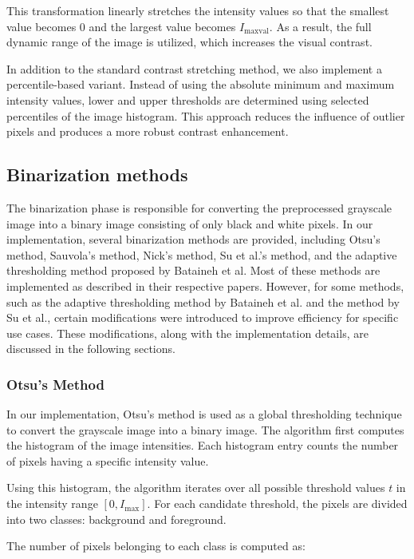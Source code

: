 This transformation linearly stretches the intensity values so that the smallest value becomes $0$ and the largest value becomes $I_{\text{maxval}}$. As a result, the full dynamic range of the image is utilized, which increases the visual contrast.

In addition to the standard contrast stretching method, we also implement a percentile-based variant. Instead of using the absolute minimum and maximum intensity values, lower and upper thresholds are determined using selected percentiles of the image histogram. This approach reduces the influence of outlier pixels and produces a more robust contrast enhancement.

\subsection{Binarization methods}

The binarization phase is responsible for converting the preprocessed grayscale image into a binary image consisting of only black and white pixels. In our implementation, several binarization methods are provided, including Otsu's method, Sauvola's method, Nick's method, Su et al.'s method, and the adaptive thresholding method proposed by Bataineh et al. Most of these methods are implemented as described in their respective papers. However, for some methods, such as the adaptive thresholding method by Bataineh et al. and the method by Su et al., certain modifications were introduced to improve efficiency for specific use cases. These modifications, along with the implementation details, are discussed in the following sections.

\subsubsection{Otsu's Method}
In our implementation, Otsu's method \cite{otsu1979threshold} is used as a global thresholding
technique to convert the grayscale image into a binary image.
The algorithm first computes the histogram of the image intensities.
Each histogram entry counts the number of pixels having a specific
intensity value.

Using this histogram, the algorithm iterates over all possible
threshold values $t$ in the intensity range $[0, I_{\text{max}}]$.
For each candidate threshold, the pixels are divided into two classes:
background and foreground.

The number of pixels belonging to each class is computed as:

